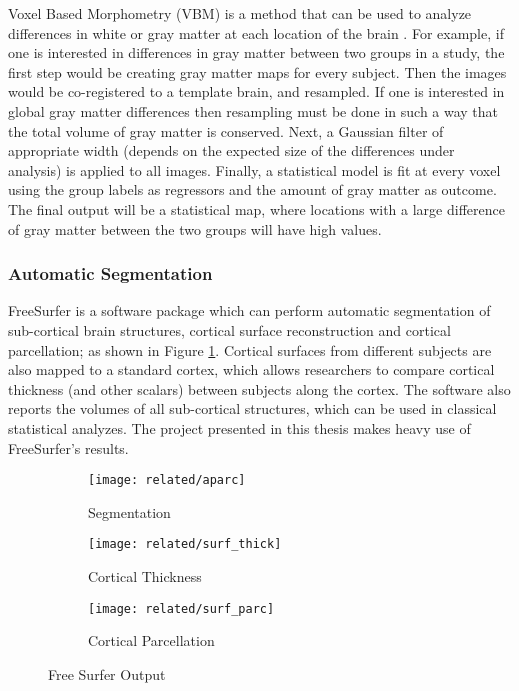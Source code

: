 Voxel Based Morphometry (VBM) is a method that can be used to analyze differences in white or gray matter at each location of the brain \autocite{friston_statistical_2007}. For example, if one is interested in differences in gray matter between two groups in a study, the first step would be creating gray matter maps for every subject. Then the images would be co-registered to a template brain, and resampled. If one is interested in global gray matter differences then resampling must be done in such a way that the total volume of gray matter is conserved. Next, a Gaussian filter of appropriate width (depends on the expected size of the differences under analysis) is applied to all images. Finally, a statistical model is fit at every voxel using the group labels as regressors and the amount of gray matter as outcome. The final output will be a statistical map, where locations with a large difference of gray matter between the two groups will have high values. 


\subsubsection{Automatic Segmentation}

FreeSurfer \autocite{dale_cortical_1999-1, fischl_whole_2002} is a software package which can perform automatic segmentation of sub-cortical brain structures, cortical surface reconstruction and cortical parcellation; as shown in Figure \ref{fig_fs_out}. Cortical surfaces from different subjects are also mapped to a standard cortex, which allows researchers to compare cortical thickness (and other scalars) between subjects along the cortex. The software also reports the volumes of all sub-cortical structures, which can be used in classical statistical analyzes. The project presented in this thesis makes heavy use of FreeSurfer's results.

\begin{figure}
    \centering
    \begin{subfigure}{0.3\textwidth}
        \texttt{[image: related/aparc]}
				\caption{Segmentation}
    \end{subfigure} \hfill
		\begin{subfigure}{0.3\textwidth}
        \texttt{[image: related/surf\_thick]}
				\caption{Cortical Thickness}
    \end{subfigure} \hfill
		    \begin{subfigure}{0.3\textwidth}
        \texttt{[image: related/surf\_parc]}
				\caption{Cortical Parcellation}
    \end{subfigure}
    \caption{Free Surfer Output}\label{fig_fs_out}
\end{figure}

